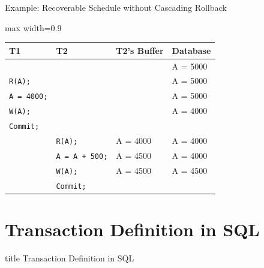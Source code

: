 \documentclass[aspectratio=169, xcolor=dvipsnames]{beamer}
\begin{document}
\begin{frame}{Example: Recoverable Schedule without Cascading Rollback}
    \begin{center}
        \begin{adjustbox}{max width=0.9\textwidth}
        \begin{tabular}{|l|l|l|l|}
        \hline
        \textbf{T1} & \textbf{T2} & \textbf{T2's Buffer} & \textbf{Database} \\ \hline
        & & & A = 5000 \\ \hline
        \texttt{R(A);} & & & A = 5000 \\ \hline
        \texttt{A = 4000;} & & & A = 5000 \\ \hline
        \texttt{W(A);} & & & A = 4000 \\ \hline
        \texttt{Commit;} & & & \\ \hline
        & \texttt{R(A);} & A = 4000 & A = 4000 \\ \hline
        & \texttt{A = A + 500;} & A = 4500 & A = 4000 \\ \hline
        & \texttt{W(A);} & A = 4500 & A = 4500 \\ \hline
        & \texttt{Commit;} & & \\ \hline
        \end{tabular}
        \end{adjustbox}
    \end{center}
    \vspace{1em}
\end{frame}

\section{Transaction Definition in SQL}

\begin{frame}
  \vfill
  \centering
  \begin{beamercolorbox}[sep=8pt,center,shadow=true,rounded=true]{title}
    Transaction Definition in SQL\par%
  \end{beamercolorbox}
  \vfill
\end{frame}
\end{document}
